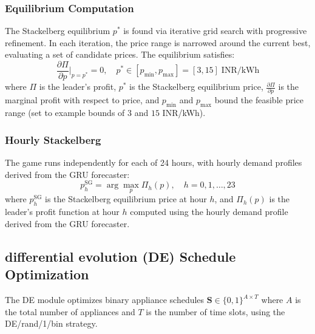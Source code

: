 \documentclass[journal]{IEEEtran}
\begin{document}
\subsubsection{Equilibrium Computation} The Stackelberg equilibrium $p^*$ is found via iterative grid search with progressive refinement. In each iteration, the price range is narrowed around the current best, evaluating a set of candidate prices. The equilibrium satisfies:
\begin{equation}
    \frac{\partial \Pi}{\partial p}\bigg|_{p=p^*} = 0, \quad p^* \in [p_{\min}, p_{\max}] = [3, 15] \; \text{INR/kWh}
    \label{eq:equilibrium}
\end{equation}
where $\Pi$ is the leader's profit, $p^*$ is the Stackelberg equilibrium price, $\frac{\partial \Pi}{\partial p}$ is the marginal profit with respect to price, and $p_{\min}$ and $p_{\max}$ bound the feasible price range (set to example bounds of $3$ and $15$ INR/kWh).

\subsubsection{Hourly Stackelberg} The game runs independently for each of 24 hours, with hourly demand profiles derived from the GRU forecaster:
\begin{equation}
    p_h^{\text{SG}} = \arg\max_p \Pi_h(p), \quad h = 0, 1, \ldots, 23
    \label{eq:hourly_sg}
\end{equation}
where $p_h^{\text{SG}}$ is the Stackelberg equilibrium price at hour $h$, and $\Pi_h(p)$ is the leader's profit function at hour $h$ computed using the hourly demand profile derived from the GRU forecaster.

\subsection{differential evolution (DE) Schedule Optimization}

The DE module optimizes binary appliance schedules $\mathbf{S} \in \{0,1\}^{A \times T}$ where $A$ is the total number of appliances and $T$ is the number of time slots, using the DE/rand/1/bin strategy.
\end{document}
